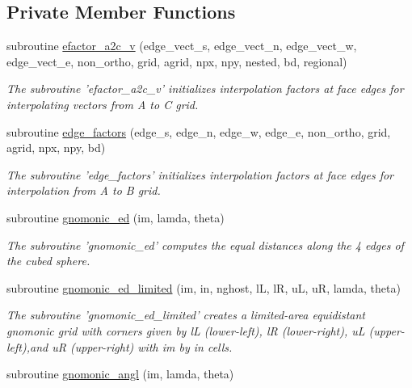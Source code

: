 \subsection*{Private Member Functions}
\begin{DoxyCompactItemize}
\item 
subroutine \hyperlink{classfv__grid__utils__mod_abec573b8aae9cac154188a3563b86708}{efactor\-\_\-a2c\-\_\-v} (edge\-\_\-vect\-\_\-s, edge\-\_\-vect\-\_\-n, edge\-\_\-vect\-\_\-w, edge\-\_\-vect\-\_\-e, non\-\_\-ortho, grid, agrid, npx, npy, nested, bd, regional)
\begin{DoxyCompactList}\small\item\em The subroutine 'efactor\-\_\-a2c\-\_\-v' initializes interpolation factors at face edges for interpolating vectors from A to C grid. \end{DoxyCompactList}\item 
subroutine \hyperlink{classfv__grid__utils__mod_acc865cb7b598fbb8a3706f3fe16c6707}{edge\-\_\-factors} (edge\-\_\-s, edge\-\_\-n, edge\-\_\-w, edge\-\_\-e, non\-\_\-ortho, grid, agrid, npx, npy, bd)
\begin{DoxyCompactList}\small\item\em The subroutine 'edge\-\_\-factors' initializes interpolation factors at face edges for interpolation from A to B grid. \end{DoxyCompactList}\item 
subroutine \hyperlink{classfv__grid__utils__mod_ad7cee44eb2dee1b439e42435af81cf4a}{gnomonic\-\_\-ed} (im, lamda, theta)
\begin{DoxyCompactList}\small\item\em The subroutine 'gnomonic\-\_\-ed' computes the equal distances along the 4 edges of the cubed sphere. \end{DoxyCompactList}\item 
subroutine \hyperlink{classfv__grid__utils__mod_a654a62678c1c5abc701da989d55f7f8a}{gnomonic\-\_\-ed\-\_\-limited} (im, in, nghost, l\-L, l\-R, u\-L, u\-R, lamda, theta)
\begin{DoxyCompactList}\small\item\em The subroutine 'gnomonic\-\_\-ed\-\_\-limited' creates a limited-\/area equidistant gnomonic grid with corners given by l\-L (lower-\/left), l\-R (lower-\/right), u\-L (upper-\/left),and u\-R (upper-\/right) with im by in cells. \end{DoxyCompactList}\item 
subroutine \hyperlink{classfv__grid__utils__mod_a8d78db3da56dcabdfb0a878dfa6072da}{gnomonic\-\_\-angl} (im, lamda, theta)

\end{DoxyCompactItemize}
